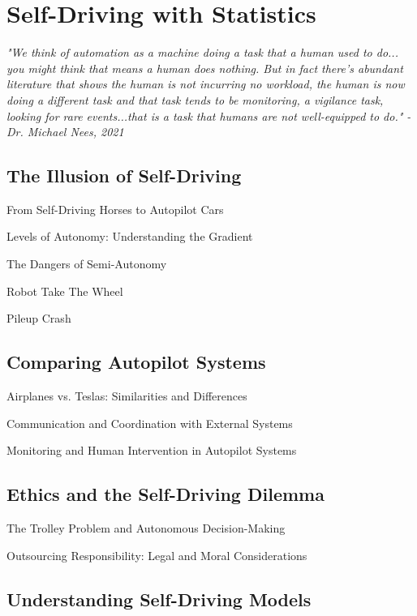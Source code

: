 \setchapterpreamble[u]{\margintoc}
\chapter{Self-Driving with Statistics}

\textit{"We think of automation as a machine doing a task that a human used to do... you might think that means a human does nothing. But in fact there's abundant literature that shows the human is not incurring no workload, the human is now doing a different task and that task tends to be monitoring, a vigilance task, looking for rare events...that is a task that humans are not well-equipped to do." - Dr. Michael Nees, 2021} \cite{nees2021}


\section{The Illusion of Self-Driving}

From Self-Driving Horses to Autopilot Cars

Levels of Autonomy: Understanding the Gradient

The Dangers of Semi-Autonomy

Robot Take The Wheel \cite{torchinskyboeckmann2019}

Pileup Crash \cite{pileupcrash}

\section{Comparing Autopilot Systems}

Airplanes vs. Teslas: Similarities and Differences

Communication and Coordination with External Systems

Monitoring and Human Intervention in Autopilot Systems

\section{Ethics and the Self-Driving Dilemma}

The Trolley Problem and Autonomous Decision-Making

Outsourcing Responsibility: Legal and Moral Considerations

\section{Understanding Self-Driving Models}

